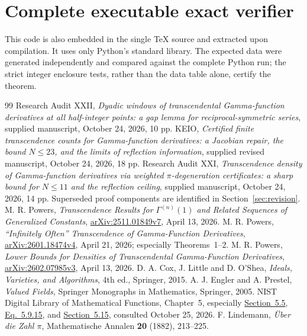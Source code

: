 \documentclass[11pt,a4paper]{article}
\theoremstyle{definition}\newtheorem{definition}[theorem]{Definition}
\theoremstyle{remark}\newtheorem{remark}[theorem]{Remark}
\begin{document}
\section{Complete executable exact verifier}\label{app:code}
This code is also embedded in the single TeX source and extracted upon compilation. It uses only Python's standard library. The expected data were generated independently and compared against the complete Python run; the strict integer enclosure tests, rather than the data table alone, certify the theorem.


\begin{thebibliography}{99}
 Research Audit XXII, \emph{Dyadic windows of transcendental Gamma-function derivatives at all half-integer points: a gap lemma for reciprocal-symmetric series}, supplied manuscript, October 24, 2026, 10 pp.
 KEIO, \emph{Certified finite transcendence counts for Gamma-function derivatives: a Jacobian repair, the bound $N\le23$, and the limits of reflection information}, supplied revised manuscript, October 24, 2026, 18 pp.
 Research Audit XXI, \emph{Transcendence density of Gamma-function derivatives via weighted $\pi$-degeneration certificates: a sharp bound for $N\le11$ and the reflection ceiling}, supplied manuscript, October 24, 2026, 14 pp. Superseded proof components are identified in Section~\ref{sec:revision}.
 M. R. Powers, \emph{Transcendence Results for $\Gamma^{(n)}(1)$ and Related Sequences of Generalized Constants}, \href{https://arxiv.org/abs/2511.01849v7}{arXiv:2511.01849v7}, April 13, 2026.
 M. R. Powers, \emph{``Infinitely Often'' Transcendence of Gamma-Function Derivatives}, \href{https://arxiv.org/abs/2601.18474v4}{arXiv:2601.18474v4}, April 21, 2026; especially Theorems~1--2.
 M. R. Powers, \emph{Lower Bounds for Densities of Transcendental Gamma-Function Derivatives}, \href{https://arxiv.org/abs/2602.07985v3}{arXiv:2602.07985v3}, April 13, 2026.
 D. A. Cox, J. Little and D. O'Shea, \emph{Ideals, Varieties, and Algorithms}, 4th ed., Springer, 2015.
 A. J. Engler and A. Prestel, \emph{Valued Fields}, Springer Monographs in Mathematics, Springer, 2005.
 NIST Digital Library of Mathematical Functions, Chapter~5, especially \href{https://dlmf.nist.gov/5.5}{Section~5.5}, \href{https://dlmf.nist.gov/5.9.E15}{Eq.~5.9.15}, and \href{https://dlmf.nist.gov/5.15}{Section~5.15}, consulted October 25, 2026.
 F. Lindemann, \emph{\"Uber die Zahl $\pi$}, Mathematische Annalen \textbf{20} (1882), 213--225.
\end{thebibliography}
\end{document}
